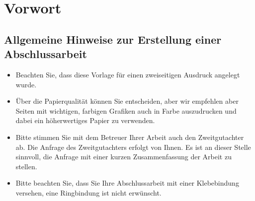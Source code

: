 %
\chapter*{Vorwort}
\label{chap:preface}

\section*{Allgemeine Hinweise zur Erstellung einer Abschlussarbeit}

\begin{itemize}
	\item Beachten Sie, dass diese Vorlage für einen zweiseitigen Ausdruck angelegt wurde.  
	\item Über die Papierqualität können Sie entscheiden, aber wir empfehlen aber Seiten mit wichtigen, farbigen Grafiken auch in Farbe auszudrucken und dabei ein höherwertiges Papier zu verwenden. 
	\item Bitte stimmen Sie mit dem Betreuer Ihrer Arbeit auch den Zweitgutachter ab. Die Anfrage des Zweitgutachters erfolgt von Ihnen. Es ist an dieser Stelle sinnvoll, die Anfrage mit einer kurzen Zusammenfassung der Arbeit zu stellen.  
	\item Bitte beachten Sie, dass Sie Ihre Abschlussarbeit mit einer Klebebindung versehen, eine Ringbindung ist nicht erwünscht. 
\end{itemize}